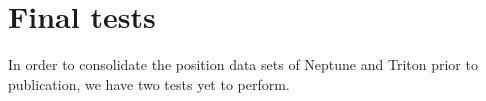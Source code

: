 \documentclass[12pt,a4paper]{report}
\begin{document}

\section*{Final tests}

In order to consolidate the position data sets of Neptune and Triton prior to publication, we have two tests yet to perform.
\end{document}
